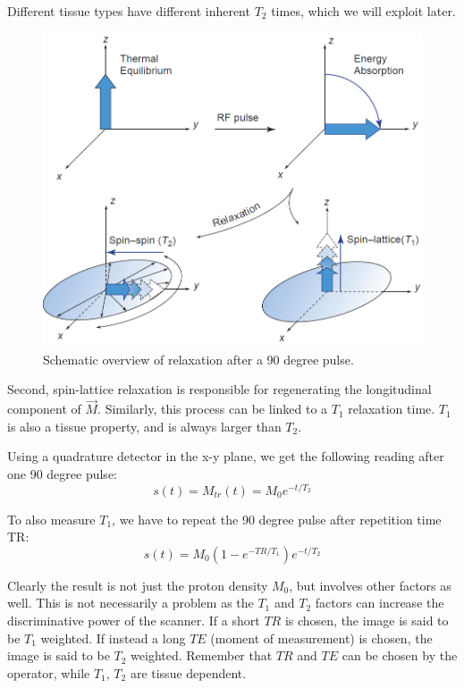Different tissue types have different inherent $T_2$ times, which we will
exploit later.

\begin{figure}[ht]
\begin{center}
  \includegraphics[width=\linewidth]{img/relaxation.png}
  \caption{Schematic overview of relaxation after a 90 degree pulse. \cite{suetens}}
  \label{fig:relaxation}
\end{center}
\end{figure}

Second, spin-lattice relaxation is responsible for regenerating the
longitudinal component of $\vec{M}$. Similarly, this process can be linked to a
$T_1$ relaxation time. $T_1$ is also a tissue property, and is always larger
than $T_2$.

Using a quadrature detector in the x-y plane, we get the following reading
after one 90 degree pulse:
\begin{equation}
s(t) = M_{tr}(t) = M_0 e^{-t/T_2}
\end{equation}

To also measure $T_1$, we have to repeat the 90 degree pulse after repetition
time TR:
\begin{equation}
s(t) = M_0 (1 - e^{-TR/T_1}) e^{-t/T_2}
\end{equation}

Clearly the result is not just the proton density $M_0$, but involves
other factors as well. This is not necessarily a problem as the $T_1$ and
$T_2$ factors can increase the discriminative power of the scanner. If a short
$TR$ is chosen, the image is said to be $T_1$ weighted. If instead a long $TE$
(moment of measurement) is chosen, the image is said to be $T_2$ weighted.
Remember that $TR$ and $TE$ can be chosen by the operator, while $T_1$, $T_2$
are tissue dependent.

